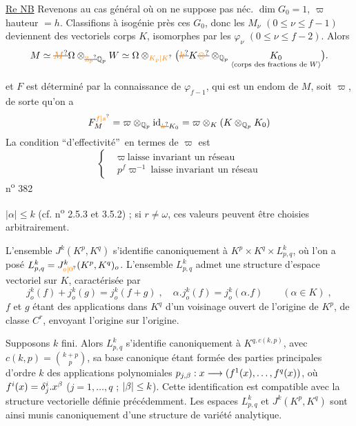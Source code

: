 \uline{Re NB} Revenons au cas général où on ne suppose pas néc. $\dim G_0=1$,  $\varpi$ hauteur $=h$. Classifions à isogénie près  ces $G_0$, donc les $M_\nu$ $(0\leq\nu\leq f-1)$ deviennent des vectoriels   corps $K$, isomorphes par les $\varphi_\nu$ $(0\leq\nu\leq f-2)$. Alors 
\[
M\simeq\deleted{\unsure{M}}\Omega\otimes_{\deleted{\unsure{\mathbb Z_p}}\mathbb Q_p}W\simeq\Omega\otimes_{\unsure{K_p|K}}\bigl(\deleted{\unsure{k}}K\deleted{\unsure{\otimes}}\otimes_{\mathbb Q_p}\underset{\inserted{\text{corps des fractions de } W}}{K_0}\bigr).
\]

et $F$ est déterminé par la connaissance de $\varphi_{f-1}$, qui est un endom de $M$, soit $\varpi$, de sorte qu'on a
\[
F_M^{\unsure{f|s}}=\varpi\otimes_{\mathbb Q_p}\mathrm{id}_{\deleted{\unsure{k}}K_0}=\varpi\otimes_K(K\otimes_{\mathbb Q_p}K_0)
\]
La condition \textquotedblleft d'effectivité\textquotedblright\ en termes de $\varpi$ est
\[
\left\{\begin{aligned}
&\varpi\ \text{laisse invariant un réseau}\\
&p^f\varpi^{-1}\ \text{laisse invariant un réseau}
\end{aligned}\right.
\]
\hfill n\textsuperscript{o} 382

$|\alpha|\leq k$ (cf. n\textsuperscript{o} 2.5.3 et 3.5.2) ; si $r\ne\omega$, ces valeurs peuvent être choisies arbitrairement.

L'ensemble $J^k(K^p,K^q)$ s'identifie canoniquement à $K^p\times K^q\times L^k_{p,q}$, où l'on a posé $L^k_{p,q}=J^k_{\unsure{o|0}}(K^p,K^q)_o$. L'ensemble $L^k_{p,q}$ admet une structure d'espace vectoriel sur $K$, caractérisée par
\[
j^k_o(f)+j^k_o(g)=j^k_o(f+g)\;,\quad\alpha.j^k_o(f)=j^k_o(\alpha.f)\qquad(\alpha\in K)\;,
\]
$f$ et $g$ étant des applications dans $K^q$ d'un voisinage ouvert de l'origine de $K^p$, de classe $C^r$, envoyant l'origine sur l'origine.

Supposons $k$ fini. Alors $L^k_{p,q}$ s'identifie canoniquement à $K^{q,c(k,p)}$, avec $c(k,p)=\binom{k+p}{p}$, sa base canonique étant formée des parties principales d'ordre $k$ des applications polynomiales $p_{j,\beta}:x\longrightarrow(f^1(x),\ldots,f^q(x))$, où $f^i(x)=\delta^i_j.x^{\beta}$ ($j=1,\ldots,q$ ; $|\beta|\leq k$). Cette identification est compatible avec la structure vectorielle définie précédemment. Les espaces $L^k_{p,q}$ et $J^k(K^p,K^q)$ sont ainsi munis canoniquement d'une structure de variété analytique.

